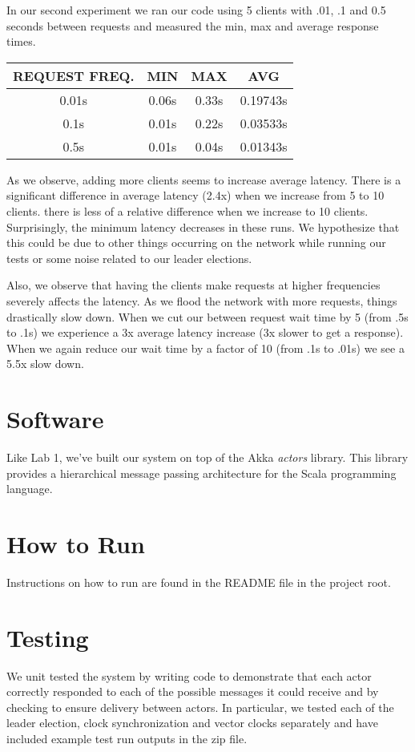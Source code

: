 \documentclass[11pt]{article}
\begin{document}
In our second experiment we ran our code using 5 clients with .01, .1
and 0.5 seconds between requests and measured the min, max and
average response times.

\begin{tabular}{c|c|c|c}
  REQUEST FREQ. & MIN & MAX & AVG \\
  \hline
  0.01s & 0.06s & 0.33s & 0.19743s \\
  0.1s  & 0.01s & 0.22s & 0.03533s \\
  0.5s  & 0.01s & 0.04s & 0.01343s \\
\end{tabular}

As we observe, adding more clients seems to increase average latency.
There is a significant difference in average latency (2.4x) when we
increase from 5 to 10 clients.  there is less of a relative difference
when we increase to 10 clients. Surprisingly, the minimum latency
decreases in these runs. We hypothesize that this could be due to
other things occurring on the network while running our tests or some
noise related to our leader elections.

Also, we observe that having the clients make requests at higher
frequencies severely affects the latency.  As we flood the network
with more requests, things drastically slow down.  When we cut our
between request wait time by 5 (from .5s to .1s) we experience a 3x
average latency increase (3x slower to get a response).  When we again
reduce our wait time by a factor of 10 (from .1s to .01s) we see a
5.5x slow down.

\section{Software}
Like Lab 1, we've built our system on top of the Akka \emph{actors}
library.  This library provides a hierarchical message passing
architecture for the Scala programming language.

\section{How to Run}
Instructions on how to run are found in the README file in the project root.

\section{Testing} %
\label{sec:testing}

We unit tested the system by writing code to demonstrate that each actor correctly responded to each of the possible messages it could receive and by checking to ensure delivery between actors. In particular, we tested each of the leader election, clock synchronization and vector clocks separately and have included example test run outputs in the zip file.

\end{document}
